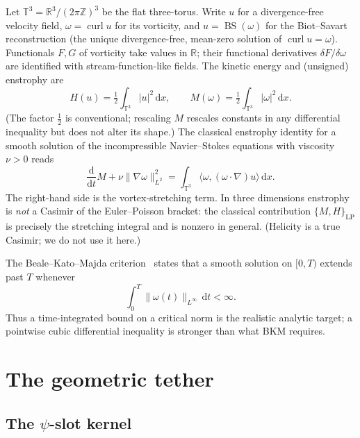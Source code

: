 \documentclass[11pt,reqno]{amsart}
\theoremstyle{plain}
\theoremstyle{definition}
\theoremstyle{remark}
\newcommand{\TT}{\mathbb{T}}
\newcommand{\R}{\mathbb{R}}
\newcommand{\Z}{\mathbb{Z}}
\newcommand{\dd}{\mathrm{d}}
\DeclareMathOperator{\curl}{curl}
\DeclareMathOperator{\BS}{BS}
\begin{document}
Let $\TT^3=\R^3/(2\pi\Z)^3$ be the flat three-torus. Write $u$ for a
divergence-free velocity field, $\omega=\curl u$ for its vorticity, and
$u=\BS(\omega)$ for the Biot--Savart reconstruction (the unique
divergence-free, mean-zero solution of $\curl u=\omega$). Functionals
$F,G$ of vorticity take values in $\R$; their functional derivatives
$\delta F/\delta\omega$ are identified with stream-function-like fields.
The kinetic energy and (unsigned) enstrophy are
\begin{equation}\label{eq:HM}
  H(u)=\tfrac12\int_{\TT^3}|u|^2\,\dd x,\qquad
  M(\omega)=\tfrac12\int_{\TT^3}|\omega|^2\,\dd x.
\end{equation}
(The factor $\tfrac12$ is conventional; rescaling $M$ rescales constants in
any differential inequality but does not alter its shape.) The classical
enstrophy identity for a smooth solution of the incompressible
Navier--Stokes equations with viscosity $\nu>0$ reads
\begin{equation}\label{eq:enstrophy}
  \frac{\dd}{\dd t}M+\nu\|\nabla\omega\|_{L^2}^2
  =\int_{\TT^3}\bigl\langle\omega,(\omega\cdot\nabla)u\bigr\rangle\,\dd x.
\end{equation}
The right-hand side is the vortex-stretching term. In three dimensions
enstrophy is \emph{not} a Casimir of the Euler--Poisson bracket: the
classical contribution $\{M,H\}_{\mathrm{LP}}$ is precisely the stretching
integral and is nonzero in general. (Helicity is a true Casimir; we do not
use it here.)

The Beale--Kato--Majda criterion~\cite{BKM1984} states that a smooth solution
on $[0,T)$ extends past $T$ whenever
\begin{equation}\label{eq:BKM}
  \int_0^T\|\omega(t)\|_{L^\infty}\,\dd t<\infty.
\end{equation}
Thus a time-integrated bound on a critical norm is the realistic analytic
target; a pointwise cubic differential inequality is stronger than what BKM
requires.

\section{The geometric tether}\label{sec:tether}

\subsection{The \texorpdfstring{$\psi$}{psi}-slot kernel}
\end{document}
